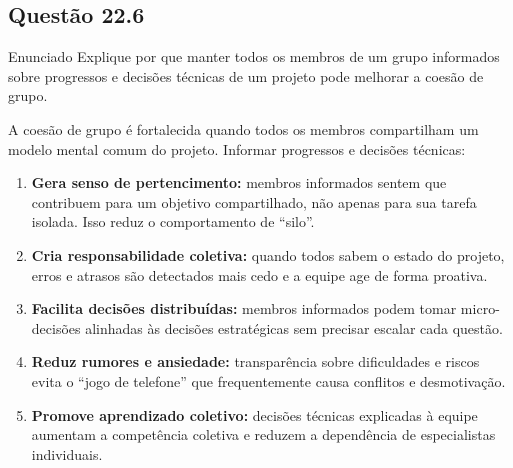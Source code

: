 \documentclass[12pt,a4paper]{article}
\begin{document}
\subsection*{Questão 22.6}
\begin{questao}{Enunciado}
Explique por que manter todos os membros de um grupo informados sobre
progressos e decisões técnicas de um projeto pode melhorar a coesão de grupo.
\end{questao}
\begin{resposta}
A coesão de grupo é fortalecida quando todos os membros compartilham um
modelo mental comum do projeto. Informar progressos e decisões técnicas:

\begin{enumerate}[nosep]
  \item \textbf{Gera senso de pertencimento:} membros informados sentem que
        contribuem para um objetivo compartilhado, não apenas para sua tarefa
        isolada. Isso reduz o comportamento de ``silo''.
  \item \textbf{Cria responsabilidade coletiva:} quando todos sabem o estado
        do projeto, erros e atrasos são detectados mais cedo e a equipe age
        de forma proativa.
  \item \textbf{Facilita decisões distribuídas:} membros informados podem
        tomar micro-decisões alinhadas às decisões estratégicas sem precisar
        escalar cada questão.
  \item \textbf{Reduz rumores e ansiedade:} transparência sobre dificuldades
        e riscos evita o ``jogo de telefone'' que frequentemente causa
        conflitos e desmotivação.
  \item \textbf{Promove aprendizado coletivo:} decisões técnicas explicadas
        à equipe aumentam a competência coletiva e reduzem a dependência
        de especialistas individuais.
\end{enumerate}
\end{resposta}

\end{document}
